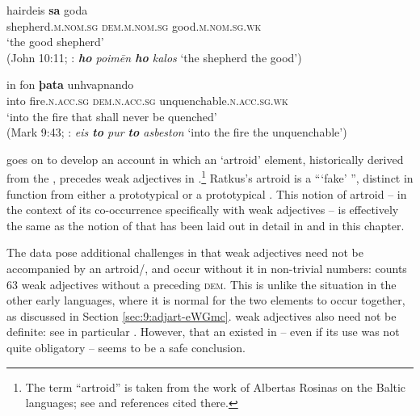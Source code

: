 \documentclass[output=paper,colorlinks,citecolor=brown]{langscibook}
\begin{document}
\begin{exe}     
 \ex\label{ex:Gothic-adjart}
 \begin{xlist}
    \ex\gll hairdeis \textbf{sa} goda\\
    shepherd.\textsc{m.nom.sg} \textsc{dem.m.nom.sg} good.\textsc{m.nom.sg.wk}\\
    \glt `the good shepherd'\\ %
    (John 10:11; : \emph{\textbf{ho} poimēn \textbf{ho} kalos} `the shepherd the good')

    \ex\gll in fon \textbf{þata} unhvapnando\\
    into fire.\textsc{n.acc.sg} \textsc{dem.n.acc.sg} unquenchable.\textsc{n.acc.sg.wk}\\
    \glt `into the fire that shall never be quenched'\\
    (Mark 9:43; : \emph{eis \textbf{to} pur \textbf{to} asbeston} `into the fire the unquenchable')
    \end{xlist}
\end{exe}

\citet[chapter 5]{ratkus2011} goes on to develop an account in which an `artroid' element, historically derived from the , precedes weak adjectives in .\footnote{The term ``artroid'' is taken from the work of Albertas Rosinas on the Baltic languages; see \citet[85--93]{Rosinas2009} and references cited there.} Ratkus's artroid is a {``}`fake' '', distinct in function from either a prototypical  or a prototypical . This notion of artroid -- in the context of its co-occurrence specifically with weak adjectives -- is effectively the same as the notion of  that has been laid out in detail in \citet{Pfaff2019} and in this chapter.

The  data pose additional challenges in that weak adjectives need not be accompanied by an artroid/, and occur without it in non-trivial numbers: \citet[141]{ratkus2011} counts 63 weak adjectives without a preceding \textsc{dem}. This is unlike the situation in the other early  languages, where it is normal for the two elements to occur together, as discussed in Section \ref{sec:9:adjart-eWGmc}.  weak adjectives also need not be definite: see in particular \citet{ratkus2018weak}. However, that an  existed in  -- even if its use was not quite obligatory -- seems to be a safe conclusion.
\end{document}
